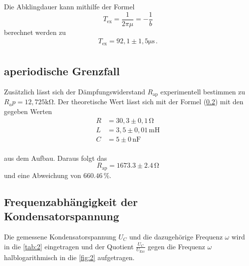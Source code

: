 \noindent
Die Abklingdauer kann mithilfe der Formel 
\begin{equation*}
    T_\text{ex} = \frac{1}{2\pi\mu} = - \frac{1}{b}
\end{equation*}
berechnet werden zu
\begin{align*}
    T_\text{ex} = 92,1 \pm 1,5 \si{\micro\second} \, . \\
\end{align*}



\subsection{aperiodische Grenzfall}
Zusätzlich lässt sich der Dämpfungswiderstand $R_\text{ap}$ experimentell bestimmen zu $R_ap = 12,725 \si{\kilo\ohm}$. Der theoretische Wert lässt sich mit der Formel (\ref{}) %
mit den gegeben Werten
\begin{align*}
   R &= 30,3 \pm 0,1 \, \si{\ohm} \\
   L &= 3,5 \pm 0,01 \, \si{\milli\henry} \\
   C &= 5 \pm 0 \, \si{\nano\farad} \\
\end{align*}

\noindent
aus dem Aufbau. Daraus folgt das $$ R_\text{ap} = 1673.3 \pm 2.4 \, \si{\ohm} $$ und eine Abweichung von $ 660.46 \, \si{\percent}$.

\subsection{Frequenzabhängigkeit der Kondensatorspannung}

Die gemessene Kondensatorspannung $U_C$ und die dazugehörige Frequenz $\omega$ wird in die \autoref{tab:2} eingetragen und 
der Quotient $\frac{U_C}{U_\text{Err}}$ gegen die Frequenz $\omega$ halblogarithmisch in die \autoref{fig:2} aufgetragen.



